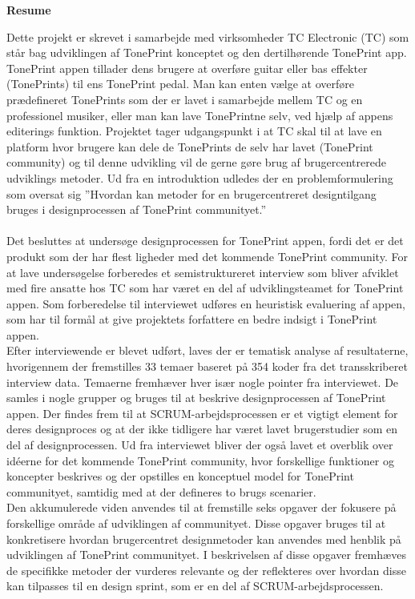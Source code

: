 \begin{LARGE}
\textbf{Resume}
\end{LARGE}
\noindent
Dette projekt er skrevet i samarbejde med virksomheder TC Electronic (TC) som står bag udviklingen af TonePrint konceptet og den dertilhørende TonePrint app. TonePrint appen tillader dens brugere at overføre guitar eller bas effekter (TonePrints) til ens TonePrint pedal. Man kan enten vælge at overføre prædefineret TonePrints som der er lavet i samarbejde mellem TC og en professionel musiker, eller man kan lave TonePrintne selv, ved hjælp af appens editerings funktion. Projektet tager udgangspunkt i at TC skal til at lave en platform hvor brugere kan dele de TonePrints de selv har lavet (TonePrint community) og til denne udvikling vil de gerne gøre brug af brugercentrerede udviklings metoder. Ud fra en introduktion udledes der en problemformulering som oversat sig ”Hvordan kan metoder for en brugercentreret designtilgang bruges i designprocessen af TonePrint communityet.” \\
\\
Det besluttes at undersøge designprocessen for TonePrint appen, fordi det er det produkt som der har flest ligheder med det kommende TonePrint community. For at lave undersøgelse forberedes et semistruktureret interview som bliver afviklet med fire ansatte hos TC som har været en del af udviklingsteamet for TonePrint appen. Som forberedelse til interviewet udføres en heuristisk evaluering af appen, som har til formål at give projektets forfattere en bedre indsigt i TonePrint appen. \\
Efter interviewende er blevet udført, laves der er tematisk analyse af resultaterne, hvorigennem der fremstilles 33 temaer baseret på 354 koder fra det transskriberet interview data. Temaerne fremhæver hver især nogle pointer fra interviewet. De samles i nogle grupper og bruges til at beskrive designprocessen af TonePrint appen. Der findes frem til at SCRUM-arbejdsprocessen er et vigtigt element for deres designproces og at der ikke tidligere har været lavet brugerstudier som en del af designprocessen. Ud fra interviewet bliver der også lavet et overblik over idéerne for det kommende TonePrint community, hvor forskellige funktioner og koncepter beskrives og der opstilles en konceptuel model for TonePrint communityet, samtidig med at der defineres to brugs scenarier. \\
Den akkumulerede viden anvendes til at fremstille seks opgaver der fokusere på forskellige område af udviklingen af communityet. Disse opgaver bruges til at konkretisere hvordan brugercentret designmetoder kan anvendes med henblik på udviklingen af TonePrint communityet. I beskrivelsen af disse opgaver fremhæves de specifikke metoder der vurderes relevante og der reflekteres over hvordan disse kan tilpasses til en design sprint, som er en del af SCRUM-arbejdsprocessen. \\

